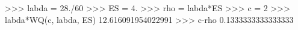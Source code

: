 
>>> labda = 28./60
>>> ES = 4.
>>> rho = labda*ES
>>> c = 2
>>> labda*WQ(c, labda, ES)
12.616091954022991
>>> c-rho
0.1333333333333333

